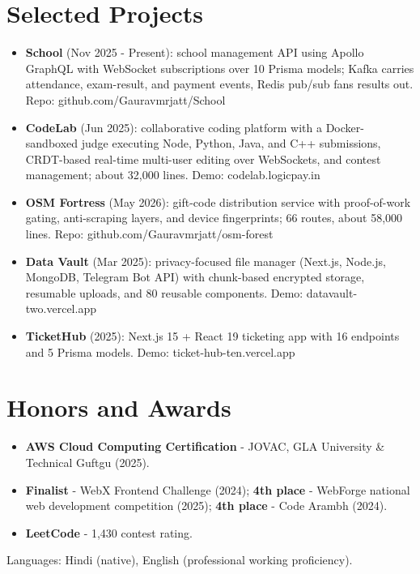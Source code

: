 \documentclass[11pt,a4paper,sans]{moderncv}
\begin{document}
\section{Selected Projects}
\vspace{1pt}
\begin{itemize}
    \item {\textbf{School} (Nov 2025 - Present): school management API using Apollo GraphQL with WebSocket subscriptions over 10 Prisma models; Kafka carries attendance, exam-result, and payment events, Redis pub/sub fans results out. Repo: github.com/Gauravmrjatt/School}
    \item {\textbf{CodeLab} (Jun 2025): collaborative coding platform with a Docker-sandboxed judge executing Node, Python, Java, and C++ submissions, CRDT-based real-time multi-user editing over WebSockets, and contest management; about 32,000 lines. Demo: codelab.logicpay.in}
    \item {\textbf{OSM Fortress} (May 2026): gift-code distribution service with proof-of-work gating, anti-scraping layers, and device fingerprints; 66 routes, about 58,000 lines. Repo: github.com/Gauravmrjatt/osm-forest}
    \item {\textbf{Data Vault} (Mar 2025): privacy-focused file manager (Next.js, Node.js, MongoDB, Telegram Bot API) with chunk-based encrypted storage, resumable uploads, and 80 reusable components. Demo: datavault-two.vercel.app}
    \item {\textbf{TicketHub} (2025): Next.js 15 + React 19 ticketing app with 16 endpoints and 5 Prisma models. Demo: ticket-hub-ten.vercel.app}
\end{itemize}


\section{Honors and Awards}
\vspace{1pt}
\begin{itemize}
    \item {\textbf{AWS Cloud Computing Certification} - JOVAC, GLA University \& Technical Guftgu (2025).}
    \item {\textbf{Finalist} - WebX Frontend Challenge (2024); \textbf{4th place} - WebForge national web development competition (2025); \textbf{4th place} - Code Arambh (2024).}
    \item {\textbf{LeetCode} - 1,430 contest rating.}
\end{itemize}


\vspace{2pt}
\small{Languages: Hindi (native), English (professional working proficiency).}
\end{document}
